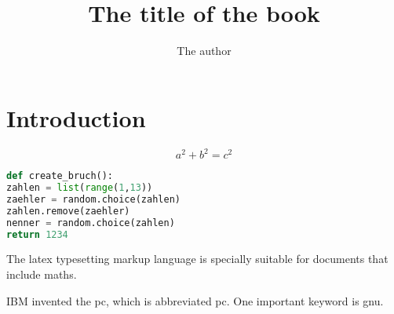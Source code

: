\documentclass[11pt,english,a5paper]{scrbook}
\title{The title of the book}
\author{The author}
\begin{document}
\maketitle

\frontmatter

\tableofcontents

\listoffigures

\listoftables

\mainmatter

\chapter{Introduction}

\blindtext

\[
a^2+b^2=c^2
\]


\begin{lstlisting}[language={Python}, label={lis:py1}, caption={Some Python Code}]
def create_bruch():
zahlen = list(range(1,13))
zaehler = random.choice(zahlen)
zahlen.remove(zaehler)
nenner = random.choice(zahlen)
return 1234
\end{lstlisting}


\blindtext

\blindtext

\blindtext

\blindtext

\backmatter

The \Gls{latex} typesetting markup language is specially suitable 
for documents that include \gls{maths}. 

IBM invented the \acrlong{pc}, which is abbreviated \acrshort{pc}. One important keyword is \acrfull{gnu}.


\printglossary[type=\acronymtype]

\printglossaries

\printindex
\end{document}
